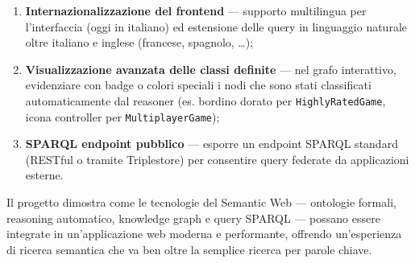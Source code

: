 \begin{enumerate}[nosep]
  \item \textbf{Internazionalizzazione del frontend} --- supporto multilingua
    per l'interfaccia (oggi in italiano) ed estensione delle query in linguaggio
    naturale oltre italiano e inglese (francese, spagnolo, \dots{});
  \item \textbf{Visualizzazione avanzata delle classi definite} --- nel grafo
    interattivo, evidenziare con badge o colori speciali i nodi che sono stati
    classificati automaticamente dal reasoner (es. bordino dorato per
    \texttt{HighlyRatedGame}, icona controller per \texttt{MultiplayerGame});
  \item \textbf{SPARQL endpoint pubblico} --- esporre un endpoint SPARQL
    standard (RESTful o tramite Triplestore) per consentire query federate
    da applicazioni esterne.
\end{enumerate}

Il progetto dimostra come le tecnologie del Semantic Web --- ontologie formali,
reasoning automatico, knowledge graph e query SPARQL --- possano essere integrate
in un'applicazione web moderna e performante, offrendo un'esperienza di ricerca
semantica che va ben oltre la semplice ricerca per parole chiave.
